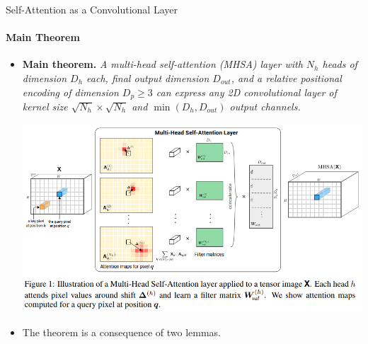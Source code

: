 \documentclass[9pt]{beamer}
\begin{document}
\begin{frame}{Self-Attention as a Convolutional Layer}
\framesubtitle{Main Theorem}
\begin{itemize}
\item \textbf{Main theorem.} \emph{A {\em multi-head self-attention} (MHSA) layer with $N_h$ heads of dimension $D_h$ each, final output dimension $D_{out}$, and a {\em relative positional encoding} of dimension $D_p\geq3$ can express any 2D convolutional layer of kernel size $\sqrt{N_h}\times\sqrt{N_h}$ and $\min(D_h, D_{out})$ output channels.}

\begin{center}
    \includegraphics[width=.8\textwidth]{presentation/images/sa_as_conv.png}
\end{center}
\vspace{-.15in}

\item The theorem is a consequence of two lemmas.
\end{itemize}
\end{frame}
\end{document}
